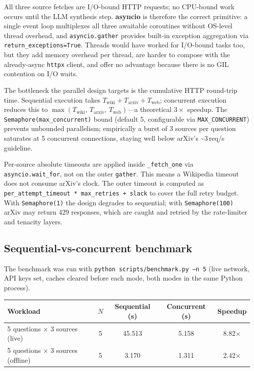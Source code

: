 \documentclass[11pt,a4paper]{article}
\begin{document}
All three source fetches are I/O-bound HTTP requests; no CPU-bound work occurs until
the LLM synthesis step. \textbf{asyncio} is therefore the correct primitive: a single
event loop multiplexes all three awaitable coroutines without OS-level thread overhead,
and \texttt{asyncio.gather} provides built-in exception aggregation via
\texttt{return\_exceptions=True}. Threads would have worked for I/O-bound tasks too,
but they add memory overhead per thread, are harder to compose with the already-async
\texttt{httpx} client, and offer no advantage because there is no GIL contention on
I/O waits.

The bottleneck the parallel design targets is the cumulative HTTP round-trip time.
Sequential execution takes $T_{\text{wiki}} + T_{\text{arxiv}} + T_{\text{web}}$;
concurrent execution reduces this to
$\max(T_{\text{wiki}},\, T_{\text{arxiv}},\, T_{\text{web}})$---a theoretical
$3\times$ speedup. The \texttt{Semaphore(max\_concurrent)} bound (default 5,
configurable via \texttt{MAX\_CONCURRENT}) prevents unbounded parallelism; empirically
a burst of 3 sources per question saturates at 5 concurrent connections, staying well
below arXiv's \textasciitilde3\,req/s guideline.

Per-source absolute timeouts are applied inside \texttt{\_fetch\_one} via
\texttt{asyncio.wait\_for}, not on the outer \texttt{gather}. This means a Wikipedia
timeout does not consume arXiv's clock. The outer timeout is computed as
\texttt{per\_attempt\_timeout * max\_retries + slack} to cover the full retry budget.
With \texttt{Semaphore(1)} the design degrades to sequential; with
\texttt{Semaphore(100)} arXiv may return 429 responses, which are caught and retried
by the rate-limiter and tenacity layers.

\subsection{Sequential-vs-concurrent benchmark}

The benchmark was run with \texttt{python scripts/benchmark.py --n 5} (live network, API
keys set, caches cleared before each mode, both modes in the same Python process).

\begin{center}\small
\begin{tabular}{lcccc}
\toprule
\textbf{Workload} & $N$ & \textbf{Sequential (s)} & \textbf{Concurrent (s)} &
  \textbf{Speedup} \\
\midrule
5 questions $\times$ 3 sources (live)    & 5 & 45.513 &  5.158 & 8.82$\times$ \\
5 questions $\times$ 3 sources (offline) & 5 &  3.170 &  1.311 & 2.42$\times$ \\
\bottomrule
\end{tabular}
\end{center}
\end{document}
